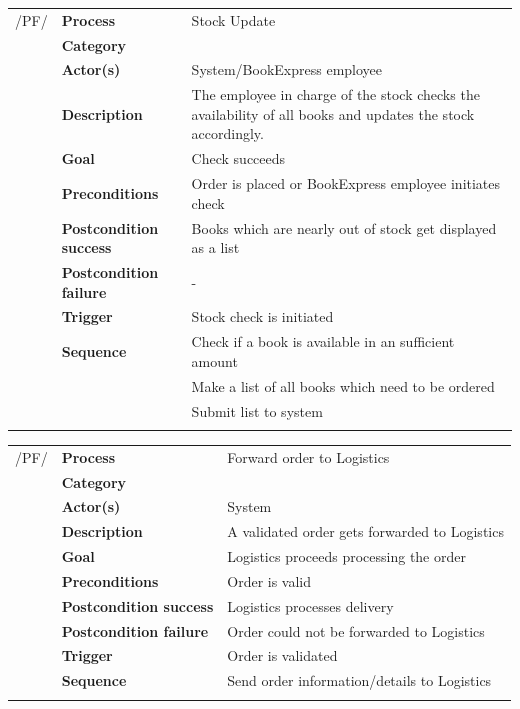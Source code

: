 \documentclass[11pt,a4paper,oneside,svgnames]{report}
\begin{document}
\noindent
\begin{tabular}{p{1.5cm}p{3cm}p{8cm}}
	 /PF/	& \textbf{Process} & Stock Update\\ 
		& \textbf{Category} & \\
		& \textbf{Actor(s)} & System/BookExpress employee\\ 
		& \textbf{Description}	 & The employee in charge of the stock checks the availability of all books and updates the stock accordingly.\\ 
		& \textbf{Goal} & Check succeeds\\
		& \textbf{Preconditions} & Order is placed or BookExpress employee initiates check\\
		& \textbf{Postcondition success} & Books which are nearly out of stock get displayed as a list\\
		& \textbf{Postcondition failure} & -\\
		& \textbf{Trigger} & Stock check is initiated\\
		& \textbf{Sequence} & Check if a book is available in an sufficient amount\\
		& & Make a list of all books which need to be ordered\\
		& & Submit list to system\\
\hfill \\
\end{tabular}

\noindent
\begin{tabular}{p{1.5cm}p{3cm}p{8cm}}
	 /PF/	& \textbf{Process} & Forward order to Logistics\\ 
		& \textbf{Category} & \\
		& \textbf{Actor(s)} & System\\ 
		& \textbf{Description}	 & A validated order gets forwarded to Logistics\\ 
		& \textbf{Goal} & Logistics proceeds processing the order\\
		& \textbf{Preconditions} & Order is valid\\
		& \textbf{Postcondition success} & Logistics processes delivery\\
		& \textbf{Postcondition failure} & Order could not be forwarded to Logistics\\
		& \textbf{Trigger} & Order is validated\\
		& \textbf{Sequence} & Send order information/details to Logistics\\
\hfill \\
\end{tabular}
\end{document}

